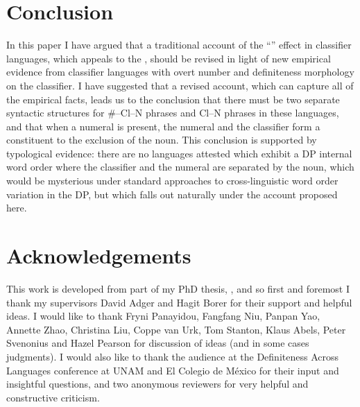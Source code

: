 \documentclass[output=paper
,modfonts
,nonflat]{langsci/langscibook}
\begin{document}
\section{Conclusion}

In this paper I have argued that a traditional account of the ``'' effect in classifier languages, which appeals to the , should be revised in light of new empirical evidence from classifier languages with overt number and definiteness morphology on the classifier. I have suggested that a revised account, which can capture all of the empirical facts, leads us to the conclusion that there must be two separate syntactic structures for \#--Cl--N phrases and Cl--N phrases in these languages, and that when a numeral is present, the numeral and the classifier form a constituent to the exclusion of the noun. This conclusion is supported by typological evidence: there are no languages attested which exhibit a DP internal word order where the classifier and the numeral are separated by the noun, which would be mysterious under standard approaches to cross-linguistic word order variation in the DP, but which falls out naturally under the account proposed here.

\section*{Acknowledgements}
This work is developed from part of my PhD thesis, \citet{Hall2015}, and so first and foremost I thank my supervisors David Adger and Hagit Borer for their support and helpful ideas. I would like to thank Fryni Panayidou, Fangfang Niu, Panpan Yao, Annette Zhao, Christina Liu, Coppe van Urk, Tom Stanton, Klaus Abels, Peter Svenonius and Hazel Pearson for discussion of ideas (and in some cases judgments). I would also like to thank the audience at the Definiteness Across Languages conference at UNAM and El Colegio de México for their input and insightful questions, and two anonymous reviewers for very helpful and constructive criticism. 
\end{document}
